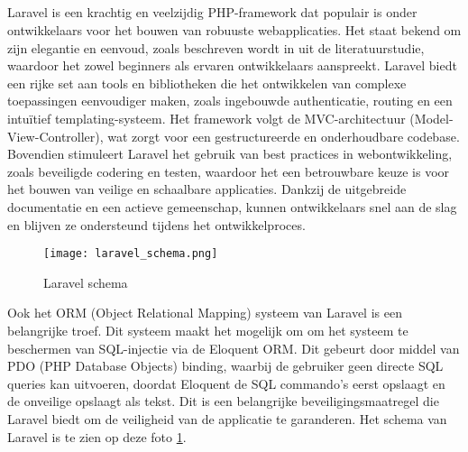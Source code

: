 \subsection{}
Laravel is een krachtig en veelzijdig PHP-framework dat populair is onder ontwikkelaars voor het bouwen van robuuste 
webapplicaties. Het staat bekend om zijn elegantie en eenvoud, zoals beschreven wordt in  
uit de literatuurstudie, waardoor het zowel beginners als ervaren ontwikkelaars 
aanspreekt. Laravel biedt een rijke set aan tools en bibliotheken die het ontwikkelen van complexe toepassingen eenvoudiger 
maken, zoals ingebouwde authenticatie, routing en een intuïtief templating-systeem. Het framework volgt de MVC-architectuur 
(Model-View-Controller), wat zorgt voor een gestructureerde en onderhoudbare codebase. Bovendien stimuleert Laravel het 
gebruik van best practices in webontwikkeling, zoals beveiligde codering en testen, waardoor het een betrouwbare keuze is 
voor het bouwen van veilige en schaalbare applicaties. Dankzij de uitgebreide documentatie en een actieve gemeenschap, kunnen 
ontwikkelaars snel aan de slag en blijven ze ondersteund tijdens het ontwikkelproces.

\begin{figure}
    \centering
    \texttt{[image: laravel\_schema.png]}
    \caption[Laravel schema]{Laravel schema}
    \label{fig:laravel_schema}
\end{figure}

Ook het ORM (Object Relational Mapping) systeem van Laravel is een belangrijke troef. Dit systeem maakt het mogelijk om 
om het systeem te beschermen van SQL-injectie via de Eloquent ORM. Dit gebeurt door middel van PDO (PHP Database Objects) binding, waarbij de
gebruiker geen directe SQL queries kan uitvoeren, doordat Eloquent de SQL commando's eerst opslaagt en de onveilige opslaagt 
als tekst. Dit is een belangrijke beveiligingsmaatregel die Laravel biedt om de veiligheid van de applicatie te garanderen.
Het schema van Laravel is te zien op deze foto \ref{fig:laravel_schema}.


